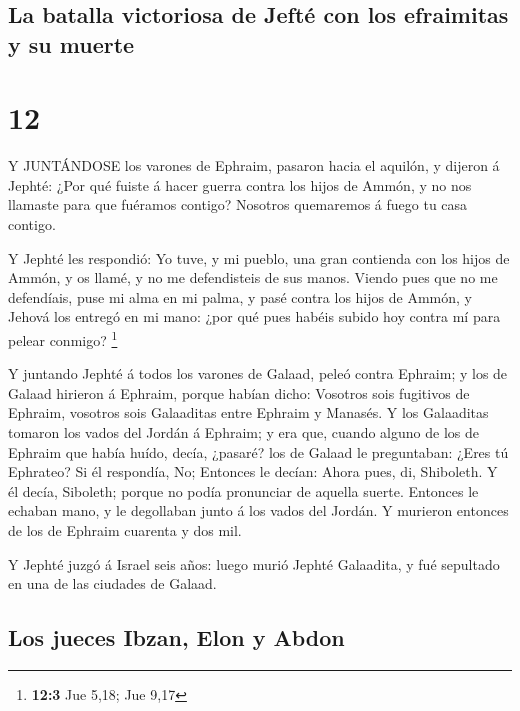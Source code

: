 \hypertarget{la-batalla-victoriosa-de-jeftuxe9-con-los-efraimitas-y-su-muerte}{%
\subsection{La batalla victoriosa de Jefté con los efraimitas y su
muerte}\label{la-batalla-victoriosa-de-jeftuxe9-con-los-efraimitas-y-su-muerte}}

\hypertarget{section-11}{%
\section{12}\label{section-11}}

 Y JUNTÁNDOSE los varones de Ephraim, pasaron hacia el
aquilón, y dijeron á Jephté: ¿Por qué fuiste á hacer guerra contra los
hijos de Ammón, y no nos llamaste para que fuéramos contigo? Nosotros
quemaremos á fuego tu casa contigo.

 Y Jephté les respondió: Yo tuve, y mi pueblo, una gran
contienda con los hijos de Ammón, y os llamé, y no me defendisteis de
sus manos.  Viendo pues que no me defendíais, puse mi alma
en mi palma, y pasé contra los hijos de Ammón, y Jehová los entregó en
mi mano: ¿por qué pues habéis subido hoy contra mí para pelear conmigo?
\footnote{\textbf{12:3} Jue 5,18; Jue 9,17}

 Y juntando Jephté á todos los varones de Galaad, peleó
contra Ephraim; y los de Galaad hirieron á Ephraim, porque habían dicho:
Vosotros sois fugitivos de Ephraim, vosotros sois Galaaditas entre
Ephraim y Manasés.  Y los Galaaditas tomaron los vados del
Jordán á Ephraim; y era que, cuando alguno de los de Ephraim que había
huído, decía, ¿pasaré? los de Galaad le preguntaban: ¿Eres tú Ephrateo?
Si él respondía, No;  Entonces le decían: Ahora pues, di,
Shiboleth. Y él decía, Siboleth; porque no podía pronunciar de aquella
suerte. Entonces le echaban mano, y le degollaban junto á los vados del
Jordán. Y murieron entonces de los de Ephraim cuarenta y dos mil.

 Y Jephté juzgó á Israel seis años: luego murió Jephté
Galaadita, y fué sepultado en una de las ciudades de Galaad.

\hypertarget{los-jueces-ibzan-elon-y-abdon}{%
\subsection{Los jueces Ibzan, Elon y
Abdon}\label{los-jueces-ibzan-elon-y-abdon}}

